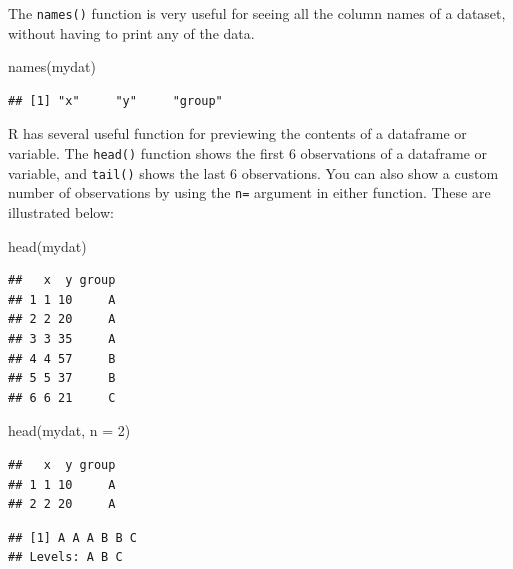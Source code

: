 \documentclass[
]{article}
\newenvironment{Shaded}{\begin{snugshade}}{\end{snugshade}}
\newcommand{\AttributeTok}[1]{\textcolor[rgb]{0.77,0.63,0.00}{#1}}
\newcommand{\DecValTok}[1]{\textcolor[rgb]{0.00,0.00,0.81}{#1}}
\newcommand{\FunctionTok}[1]{\textcolor[rgb]{0.00,0.00,0.00}{#1}}
\newcommand{\NormalTok}[1]{#1}
\newcommand{\SpecialCharTok}[1]{\textcolor[rgb]{0.00,0.00,0.00}{#1}}
\begin{document}
The \texttt{names()} function is very useful for seeing all the column names of
a dataset, without having to print any of the data.

\begin{Shaded}
\begin{Highlighting}[]
\FunctionTok{names}\NormalTok{(mydat)}
\end{Highlighting}
\end{Shaded}

\begin{verbatim}
## [1] "x"     "y"     "group"
\end{verbatim}

R has several useful function for previewing the contents of a dataframe
or variable. The \texttt{head()} function shows the first 6 observations of a
dataframe or variable, and \texttt{tail()} shows the last 6 observations. You
can also show a custom number of observations by using the \texttt{n=} argument
in either function. These are illustrated below:

\begin{Shaded}
\begin{Highlighting}[]
\FunctionTok{head}\NormalTok{(mydat)}
\end{Highlighting}
\end{Shaded}

\begin{verbatim}
##   x  y group
## 1 1 10     A
## 2 2 20     A
## 3 3 35     A
## 4 4 57     B
## 5 5 37     B
## 6 6 21     C
\end{verbatim}

\begin{Shaded}
\begin{Highlighting}[]
\FunctionTok{head}\NormalTok{(mydat, }\AttributeTok{n =} \DecValTok{2}\NormalTok{)}
\end{Highlighting}
\end{Shaded}

\begin{verbatim}
##   x  y group
## 1 1 10     A
## 2 2 20     A
\end{verbatim}

\begin{Shaded}
\end{Shaded}

\begin{verbatim}
## [1] A A A B B C
## Levels: A B C
\end{verbatim}
\end{document}
